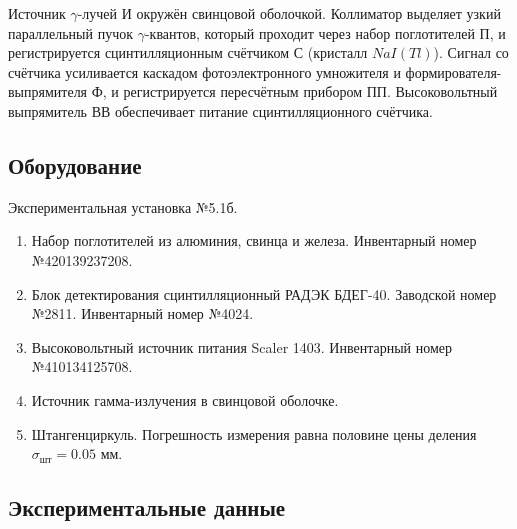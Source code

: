 \documentclass[a4paper,12pt]{article} %
\begin{document}
	Источник $\gamma$-лучей И окружён свинцовой оболочкой. Коллиматор выделяет узкий параллельный пучок $\gamma$-квантов, который проходит через набор поглотителей П, и регистрируется сцинтилляционным счётчиком С (кристалл $NaI(Tl)$). Сигнал со счётчика усиливается каскадом фотоэлектронного умножителя и формирователя-выпрямителя Ф, и регистрируется пересчётным прибором ПП. Высоковольтный выпрямитель ВВ обеспечивает питание сцинтилляционного счётчика.
	
	\subsection*{Оборудование}
	
	Экспериментальная установка №5.1б.
	
	\begin{enumerate}
		\item Набор поглотителей из алюминия, свинца и железа. Инвентарный номер №420139237208.
		
		\item Блок детектирования сцинтилляционный РАДЭК БДЕГ-40. Заводской номер №2811. Инвентарный номер №4024.
		
		\item Высоковольтный источник питания Scaler 1403. Инвентарный номер №410134125708.
		
		\item Источник гамма-излучения в свинцовой оболочке.
		
		\item Штангенциркуль. Погрешность измерения равна половине цены деления $\sigma_{\text{шт}} = 0.05$  мм.
	\end{enumerate}

 \newpage
\subsection*{Экспериментальные данные}
 
\end{document}
